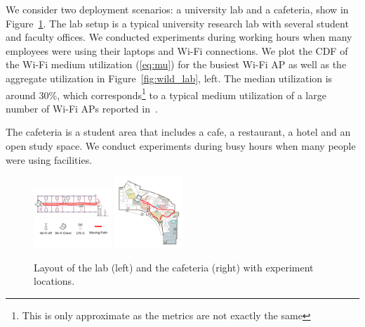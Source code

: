 We consider two deployment scenarios: a university lab and a cafeteria, show in Figure~\ref{fig:wild_layout}. The lab setup is a typical university research lab with several student and faculty offices. We conducted experiments during working hours when many employees were using their laptops and Wi-Fi connections. We plot the CDF of the Wi-Fi medium utilization (\ref{eq:mu}) for the busiest Wi-Fi AP as well as the aggregate utilization in Figure~\ref{fig:wild_lab}, left. 
The median utilization is around 30\%, which corresponds\footnote{This is only approximate as the metrics are not exactly the same} to a typical medium utilization of a large number of Wi-Fi APs reported in~\cite{meraki_sigcomm15}.

The cafeteria is a student area that includes a cafe, a restaurant, a hotel and an open study space. We conduct experiments during busy hours when many people were using facilities. 


\begin{figure}[h!]
\vspace{-12pt}
\hspace{-2pt}
    \includegraphics[width=0.26\textwidth]{./figures/floor_cs}
\hspace{-12pt}
    \includegraphics[width=0.23\textwidth]{./figures/floor_unionsouth}
\hspace{-24pt}
 \caption{Layout of the lab (left) and the cafeteria (right) with experiment locations.}
  \label{fig:wild_layout}
\end{figure}


